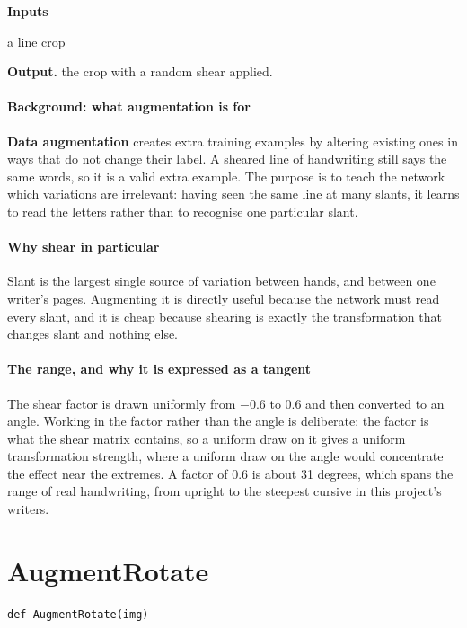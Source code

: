 \noindent\textbf{Inputs}
\begin{description}[leftmargin=2.2em,style=nextline,font=\normalfont\ttfamily]\setlength\itemsep{1pt}
  \item[{img}] \normalfont a line crop
\end{description}

\noindent\textbf{Output.} the crop with a random shear applied.


\paragraph{Background: what augmentation is for}
\textbf{Data augmentation} creates extra training examples by altering existing ones in ways that do not change their label. A sheared line of handwriting still says the same words, so it is a valid extra example. The purpose is to teach the network which variations are irrelevant: having seen the same line at many slants, it learns to read the letters rather than to recognise one particular slant.


\paragraph{Why shear in particular}
Slant is the largest single source of variation between hands, and between one writer's pages. Augmenting it is directly useful because the network must read every slant, and it is cheap because shearing is exactly the transformation that changes slant and nothing else.


\paragraph{The range, and why it is expressed as a tangent}
The shear factor is drawn uniformly from $-$0.6 to 0.6 and then converted to an angle. Working in the factor rather than the angle is deliberate: the factor is what the shear matrix contains, so a uniform draw on it gives a uniform transformation strength, where a uniform draw on the angle would concentrate the effect near the extremes. A factor of 0.6 is about 31 degrees, which spans the range of real handwriting, from upright to the steepest cursive in this project's writers.


\section{AugmentRotate}
\begin{lstlisting}[style=sig]
def AugmentRotate(img)
\end{lstlisting}

